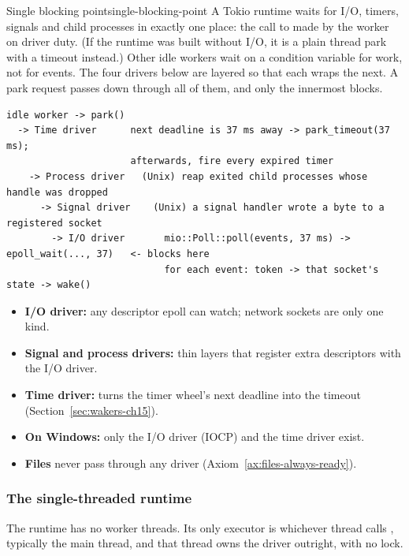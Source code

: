 \begin{lemma}{Single blocking point}{single-blocking-point}
    A Tokio runtime waits for I/O, timers, signals and child processes in exactly one place: the call to  made by the worker on driver duty. (If the runtime was built without I/O, it is a plain thread park with a timeout instead.) Other idle workers wait on a condition variable for work, not for events.
    \why The four drivers below are layered so that each wraps the next. A park request passes down through all of them, and only the innermost blocks.
\end{lemma}

\begin{lstlisting}[language={}, caption={The four driver layers, from outermost to innermost.}, label=lst:wakers-11.1]
idle worker -> park()
  -> Time driver      next deadline is 37 ms away -> park_timeout(37 ms);
                      afterwards, fire every expired timer
    -> Process driver   (Unix) reap exited child processes whose handle was dropped
      -> Signal driver    (Unix) a signal handler wrote a byte to a registered socket
        -> I/O driver       mio::Poll::poll(events, 37 ms) -> epoll_wait(..., 37)   <- blocks here
                            for each event: token -> that socket's state -> wake()
\end{lstlisting}

\begin{itemize}
    \item \textbf{I/O driver:} any descriptor epoll can watch; network sockets are only one kind.
    \item \textbf{Signal and process drivers:} thin layers that register extra descriptors with the I/O driver.
    \item \textbf{Time driver:} turns the timer wheel's next deadline into the timeout (Section~\ref{sec:wakers-ch15}).
    \item \textbf{On Windows:} only the I/O driver (IOCP) and the time driver exist.
    \item \textbf{Files} never pass through any driver (Axiom~\ref{ax:files-always-ready}).
\end{itemize}

\subsubsection{The single-threaded runtime}

The  runtime has no worker threads. Its only executor is whichever thread calls , typically the main thread, and that thread owns the driver outright, with no lock.

